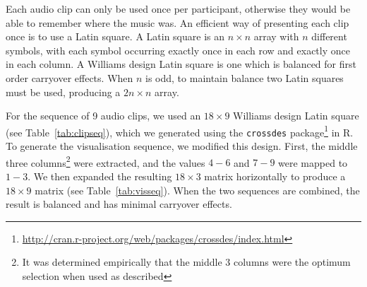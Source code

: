 Each audio clip can only be used once per participant, otherwise they would be able to remember where the music was. An
efficient way of presenting each clip once is to use a Latin square. A Latin square is an $n \times n$ array with $n$
different symbols, with each symbol occurring exactly once in each row and exactly once in each column. A Williams
design Latin square \citep{Williams1949} is one which is balanced for first order carryover effects.  When $n$ is odd,
to maintain balance two Latin squares must be used, producing a $2n \times n$ array.

For the sequence of 9 audio clips, we used an $18\times9$ Williams design Latin square (see Table~\ref{tab:clipseq}),
which we generated using the \texttt{crossdes}
package\footnote{\url{http://cran.r-project.org/web/packages/crossdes/index.html}} in R. To generate the visualisation
sequence, we modified this design. First, the middle three columns\footnote{It was determined empirically that the
  middle 3 columns were the optimum selection when used as described} were extracted, and the values $4-6$ and $7-9$
were mapped to $1-3$. We then expanded the resulting $18\times3$ matrix horizontally to produce a $18\times9$ matrix
(see Table~\ref{tab:visseq}). When the two sequences are combined, the result is balanced and has minimal carryover
effects.

